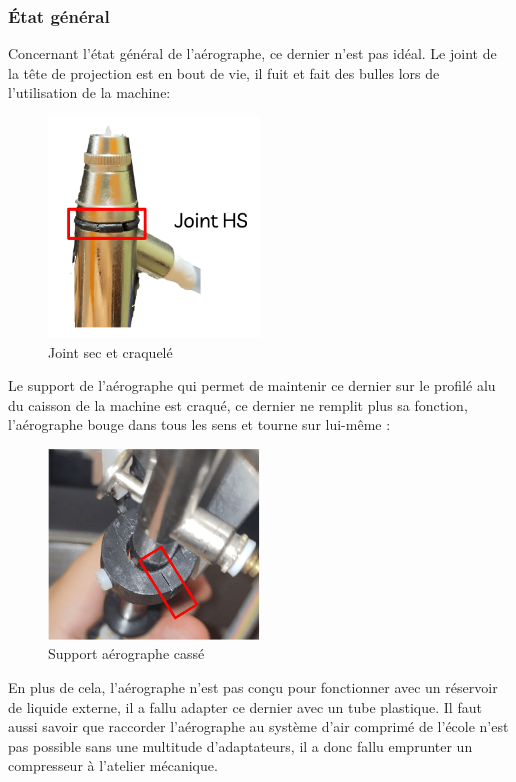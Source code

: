 \newpage
\subsubsection{État général}
Concernant l'état général de l'aérographe, ce dernier n'est pas idéal.
Le joint de la tête de projection est en bout de vie, il fuit et fait des bulles lors de l'utilisation de la machine:
\begin{figure}[H]
    \centering
    \includegraphics[width = 0.5\textwidth]{assets/figures/situation_initiale/joint_aerographe_HS.png}
    \caption{Joint sec et craquelé}
\end{figure}

Le support de l'aérographe qui permet de maintenir ce dernier sur le profilé alu du caisson de la machine est craqué,
ce dernier ne remplit plus sa fonction, l'aérographe bouge dans tous les sens et tourne sur lui-même :
\begin{figure}[H]
    \centering
    \includegraphics[width = 0.5\textwidth]{assets/figures/situation_initiale/support_aerographe_casse.png}
    \caption{Support aérographe cassé}
\end{figure}
En plus de cela, l'aérographe n'est pas conçu pour fonctionner avec un réservoir de liquide externe, il a fallu adapter ce dernier avec un tube plastique.
Il faut aussi savoir que raccorder l'aérographe au système d'air comprimé de l'école n'est pas possible sans une multitude d'adaptateurs, il a donc fallu emprunter
un compresseur à l'atelier mécanique.

